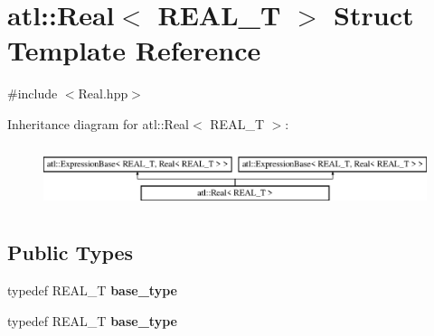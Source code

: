 \hypertarget{structatl_1_1_real}{\section{atl\+:\+:Real$<$ R\+E\+A\+L\+\_\+\+T $>$ Struct Template Reference}
\label{structatl_1_1_real}
}


{\ttfamily \#include $<$Real.\+hpp$>$}

Inheritance diagram for atl\+:\+:Real$<$ R\+E\+A\+L\+\_\+\+T $>$\+:\begin{figure}[H]
\begin{center}
\leavevmode
\includegraphics[height=1.848185cm]{structatl_1_1_real}
\end{center}
\end{figure}
\subsection*{Public Types}
\begin{DoxyCompactItemize}
\item 
\hypertarget{structatl_1_1_real_a777fa3a51746bde9ee8f79ffe26ace07}{typedef R\+E\+A\+L\+\_\+\+T {\bfseries base\+\_\+type}}\label{structatl_1_1_real_a777fa3a51746bde9ee8f79ffe26ace07}

\item 
\hypertarget{structatl_1_1_real_a777fa3a51746bde9ee8f79ffe26ace07}{typedef R\+E\+A\+L\+\_\+\+T {\bfseries base\+\_\+type}}\label{structatl_1_1_real_a777fa3a51746bde9ee8f79ffe26ace07}

\end{DoxyCompactItemize}
